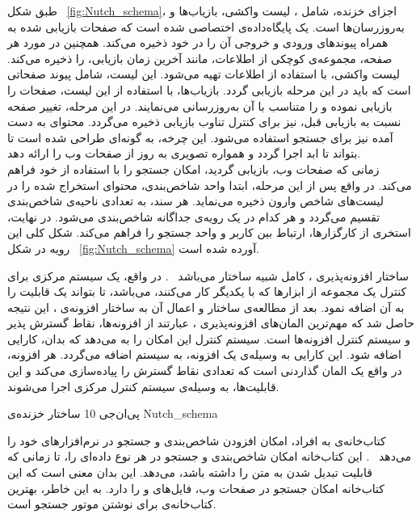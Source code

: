 

طبق شکل ~\ref{fig:Nutch_schema}، اجزای خزنده، شامل ، لیست واکشی، بازیاب‌ها و به‌روزرسان‌ها است.  یک پایگاه‌داده‌ی اختصاصی شده است که صفحات بازیابی شده به همراه پیوندهای ورودی و خروجی آن را در خود ذخیره می‌کند. همچنین در مورد هر صفحه، مجموعه‌ی کوچکی از اطلاعات، مانند آخرین زمان بازیابی، را ذخیره می‌کند. لیست واکشی، با استفاده از اطلاعات  تهیه می‌شود.  این لیست، شامل پیوند صفحاتی است که باید در این مرحله بازیابی گردد. بازیاب‌ها، با استفاده از  این لیست، صفحات را بازیابی نموده و  را متناسب با آن به‌روزرسانی می‌نمایند. در این مرحله، تغییر صفحه نسبت به بازیابی قبل، نیز برای کنترل تناوب بازیابی ذخیره می‌گردد. محتوای به دست آمده نیز برای جستجو استفاده می‌شود. این چرخه، به گونه‌ای طراحی شده است تا بتواند تا ابد اجرا گردد و همواره تصویری به روز از صفحات وب را ارائه دهد.
\\
زمانی که صفحات وب، بازیابی گردید،  امکان جستجو را با استفاده از  خود فراهم می‌کند. در واقع پس از این مرحله، ابتدا واحد شاخص‌بندی، محتوای استخراج شده را در لیست‌های شاخص وارون ذخیره می‌نماید. هر سند، به تعدادی ناحیه‌ی شاخص‌بندی تقسیم می‌گردد و هر کدام در یک رویه‌ی جداگانه شاخص‌بندی می‌شود. در نهایت، استخری از کارگزارها، ارتباط بین کاربر و واحد جستجو را فراهم می‌کند. شکل کلی این رویه در شکل ~\ref{fig:Nutch_schema} آورده شده است.

ساختار افزونه‌پذیری ، کامل شبیه ساختار  می‌باشد
~\cite{Eclipse-plugin}.
 در واقع،  یک سیستم مرکزی برای کنترل یک مجموعه از ابزارها که با یکدیگر کار می‌کنند، می‌باشد، تا بتواند یک قابلیت را به آن اضافه نمود. بعد از مطالعه‌ی ساختار  و اعمال آن به ساختار افزونه‌ی ، این نتیجه حاصل شد که مهم‌ترین المان‌های افزونه‌پذیری ، عبارتند از افزونه‌ها، نقاط گسترش پذیر و سیستم کنترل افزونه‌ها است. سیستم کنترل این امکان را به  می‌دهد که بدان، کارایی اضافه شود. این کارایی به وسیله‌ی یک افزونه، به سیستم اضافه می‌گردد. هر افزونه، در واقع یک المان گذاردنی است که تعدادی نقاط گسترش را پیاده‌سازی می‌کند و این قابلیت‌ها، به وسیله‌ی سیستم کنترل مرکزی اجرا می‌شوند.

‌پی‌ان‌جی {10} {ساختار خزنده‌ی } {Nutch_schema}


کتاب‌خانه‌ی  به افراد، امکان افزودن شاخص‌بندی و جستجو در نرم‌افزارهای خود را می‌دهد
~\cite{Lucene-info}.
این کتاب‌خانه امکان شاخص‌بندی و جستجو در هر نوع داده‌ای را، تا زمانی که قابلیت تبدیل شدن به متن را داشته باشد، می‌دهد. این بدان معنی است که این کتاب‌خانه امکان جستجو در صفحات وب، فایل‌های  و  را دارد. به این خاطر،  بهترین کتاب‌خانه‌ی برای نوشتن موتور جستجو است.

